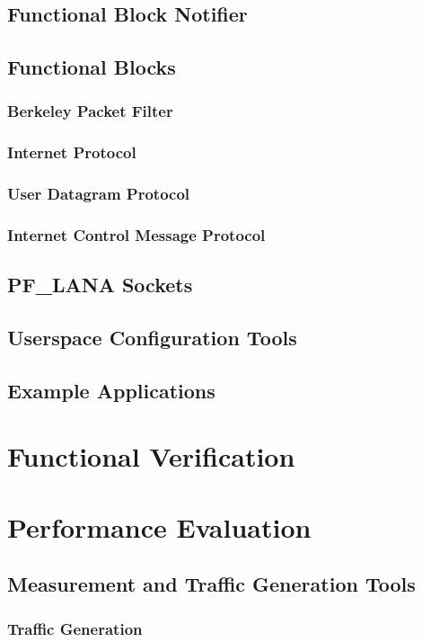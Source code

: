 \section{Functional Block Notifier}
\section{Functional Blocks} %
\subsection{Berkeley Packet Filter}
\subsection{Internet Protocol}
\subsection{User Datagram Protocol}
\subsection{Internet Control Message Protocol}
\section{PF\_LANA Sockets}
\section{Userspace Configuration Tools}
\section{Example Applications}

\chapter{\label{chp:content} Functional Verification}

\chapter{\label{chp:content} Performance Evaluation}
\section{Measurement and Traffic Generation Tools}
\subsection{Traffic Generation}

